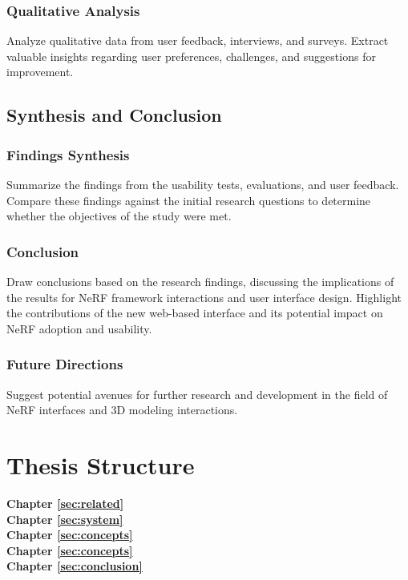 \subsubsection{Qualitative Analysis}
Analyze qualitative data from user feedback, interviews, and surveys. Extract valuable insights regarding user preferences, challenges, and suggestions for improvement.

\subsection{Synthesis and Conclusion}

\subsubsection{Findings Synthesis}
Summarize the findings from the usability tests, evaluations, and user feedback. Compare these findings against the initial research questions to determine whether the objectives of the study were met.

\subsubsection{Conclusion}
Draw conclusions based on the research findings, discussing the implications of the results for NeRF framework interactions and user interface design. Highlight the contributions of the new web-based interface and its potential impact on NeRF adoption and usability.

\subsubsection{Future Directions}
Suggest potential avenues for further research and development in the field of NeRF interfaces and 3D modeling interactions.

\section{Thesis Structure}
\label{sec:intro:structure}

\textbf{Chapter \ref{sec:related}} \\[0.2em]

\textbf{Chapter \ref{sec:system}} \\[0.2em]

\textbf{Chapter \ref{sec:concepts}} \\[0.2em]

\textbf{Chapter \ref{sec:concepts}} \\[0.2em]

\textbf{Chapter \ref{sec:conclusion}} \\[0.2em]
